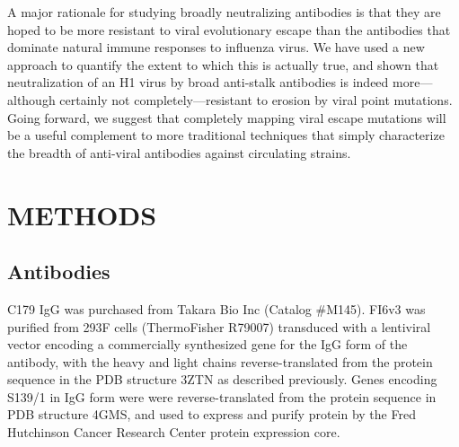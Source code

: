 \documentclass[11pt]{article}
\begin{document}
A major rationale for studying broadly neutralizing antibodies is that they are hoped to be more resistant to viral evolutionary escape than the antibodies that dominate natural immune responses to influenza virus\cite{krammer2015advances,corti2017tackling}.
We have used a new approach to quantify the extent to which this is actually true, and shown that neutralization of an H1 virus by broad anti-stalk antibodies is indeed more---although certainly not completely---resistant to erosion by viral point mutations.
Going forward, we suggest that completely mapping viral escape mutations will be a useful complement to more traditional techniques that simply characterize the breadth of anti-viral antibodies against circulating strains.

\clearpage
\small

\section*{METHODS}
\label{sec:methods}
\subsection*{Antibodies}
C179 IgG was purchased from Takara Bio Inc (Catalog \#M145).
FI6v3 was purified from 293F cells (ThermoFisher R79007) transduced with a lentiviral vector encoding a commercially synthesized gene for the IgG form of the antibody, with the heavy and light chains reverse-translated from the protein sequence in the PDB structure 3ZTN\cite{corti2011neutralizing} as described previously\cite{balazs2013broad}.
Genes encoding S139/1 in IgG form were were reverse-translated from the protein sequence in PDB structure 4GMS\cite{lee2012heterosubtypic}, and used to express and purify protein by the Fred Hutchinson Cancer Research Center protein expression core.
\end{document}
